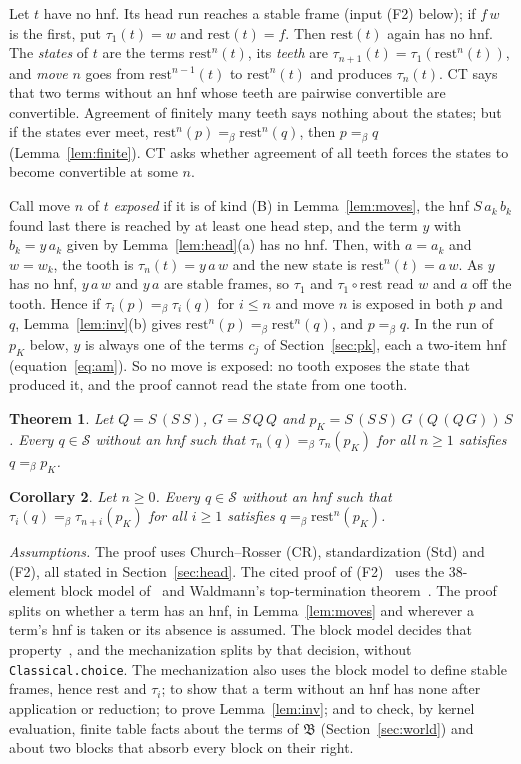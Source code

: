 \documentclass[11pt]{amsart}
\newtheorem{theorem}{Theorem}
\newtheorem{corollary}[theorem]{Corollary}
\theoremstyle{definition}
\newcommand{\Ter}{\mathcal S}
\newcommand{\conv}{=_\beta}
\newcommand{\rest}{\mathrm{rest}}
\newcommand{\pK}{p_K}
\newcommand{\B}{\mathfrak B}
\begin{document}
Let $t$ have no hnf. Its head run reaches a stable frame (input (F2) below); if $f\,w$ is the first,
put $\tau_1(t)=w$ and $\rest(t)=f$. Then $\rest(t)$ again has no hnf. The \emph{states} of $t$ are the
terms $\rest^n(t)$, its \emph{teeth} are $\tau_{n+1}(t)=\tau_1(\rest^n(t))$, and \emph{move} $n$ goes
from $\rest^{n-1}(t)$ to $\rest^n(t)$ and produces $\tau_n(t)$. CT says that two terms without an hnf
whose teeth are pairwise convertible are convertible. Agreement of finitely many teeth says nothing
about the states; but if the states ever meet, $\rest^n(p)\conv\rest^n(q)$, then $p\conv q$
(Lemma~\ref{lem:finite}). CT asks whether agreement of all teeth forces the states to become
convertible at some $n$.

Call move $n$ of $t$ \emph{exposed} if it is of kind (B) in Lemma~\ref{lem:moves}, the hnf
$S\,a_k\,b_k$ found last there is reached by at least one head step, and the term $y$ with
$b_k=y\,a_k$ given by Lemma~\ref{lem:head}(a) has no hnf. Then, with $a=a_k$ and $w=w_k$, the tooth
is $\tau_n(t)=y\,a\,w$ and the new state is $\rest^n(t)=a\,w$. As $y$ has no hnf, $y\,a\,w$ and
$y\,a$ are stable frames, so $\tau_1$ and $\tau_1\circ\rest$ read $w$ and $a$ off the tooth. Hence if
$\tau_i(p)\conv\tau_i(q)$ for $i\le n$ and move $n$ is exposed in both $p$ and $q$,
Lemma~\ref{lem:inv}(b) gives $\rest^n(p)\conv\rest^n(q)$, and $p\conv q$. In the run of $\pK$
below, $y$ is always one of the terms $c_j$ of Section~\ref{sec:pk}, each a two-item hnf
(equation~\eqref{eq:am}). So no move is exposed: no tooth exposes the state that produced it, and
the proof cannot read the state from one tooth.

\begin{theorem}\label{thm:main}
Let $Q=S\,(S\,S)$, $G=S\,Q\,Q$ and $\pK=S\,(S\,S)\,G\,(Q\,(Q\,G))\,S$. Every $q\in\Ter$ without an
hnf such that $\tau_n(q)\conv\tau_n(\pK)$ for all $n\ge1$ satisfies $q\conv\pK$.
\end{theorem}

\begin{corollary}\label{cor:rests}
Let $n\ge0$. Every $q\in\Ter$ without an hnf such that $\tau_i(q)\conv\tau_{n+i}(\pK)$ for all
$i\ge1$ satisfies $q\conv\rest^n(\pK)$.
\end{corollary}

\emph{Assumptions.} The proof uses Church--Rosser (CR), standardization (Std) and (F2), all stated
in Section~\ref{sec:head}. The cited proof of (F2)~\citep{s1,s3} uses the 38-element block model
of~\citep{s1} and Waldmann's top-termination theorem~\citep[Theorem~3]{s3}. The proof splits on
whether a term has an hnf, in Lemma~\ref{lem:moves} and wherever a term's hnf is taken or its
absence is assumed. The block model decides that property~\citep[Proposition~4 and
Theorem~9]{s1}, and the mechanization splits by that decision, without \texttt{Classical.choice}.
The mechanization also uses the block model to define stable frames, hence $\rest$ and $\tau_i$;
to show that a term without an hnf has none after application or reduction; to prove
Lemma~\ref{lem:inv}; and to check, by kernel evaluation, finite table facts about the terms of $\B$
(Section~\ref{sec:world}) and about two blocks that absorb every block on their right.
\end{document}
